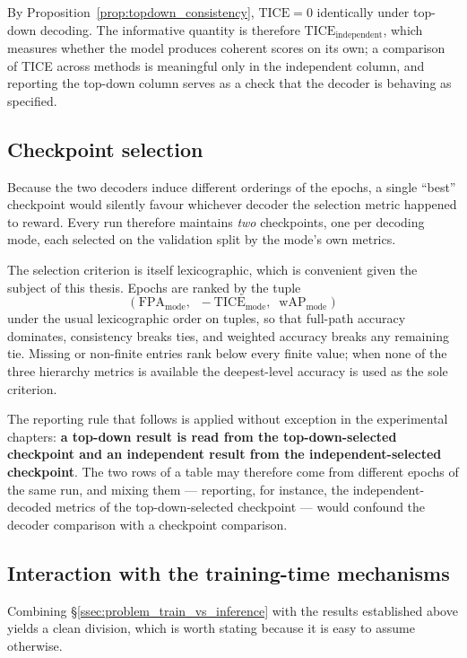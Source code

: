 By Proposition~\ref{prop:topdown_consistency}, $\mathrm{TICE}=0$ identically under
top-down decoding. The informative quantity is therefore
$\mathrm{TICE}_{\text{independent}}$, which measures whether the model produces
coherent scores on its own; a comparison of TICE across methods is meaningful only
in the independent column, and reporting the top-down column serves as a check
that the decoder is behaving as specified.

\subsection{Checkpoint selection}
\label{ssec:inference_selection}

Because the two decoders induce different orderings of the epochs, a single
``best'' checkpoint would silently favour whichever decoder the selection metric
happened to reward. Every run therefore maintains \emph{two} checkpoints, one per
decoding mode, each selected on the validation split by the mode's own metrics.

The selection criterion is itself lexicographic, which is convenient given the
subject of this thesis. Epochs are ranked by the tuple
\[
\Big(\;\mathrm{FPA}_{\text{mode}},\;\; -\mathrm{TICE}_{\text{mode}},\;\;
\mathrm{wAP}_{\text{mode}}\;\Big)
\]
under the usual lexicographic order on tuples, so that full-path accuracy
dominates, consistency breaks ties, and weighted accuracy breaks any remaining
tie. Missing or non-finite entries rank below every finite value; when none of the
three hierarchy metrics is available the deepest-level accuracy is used as the
sole criterion.

The reporting rule that follows is applied without exception in the experimental
chapters: \textbf{a top-down result is read from the top-down-selected checkpoint
and an independent result from the independent-selected checkpoint}. The two rows
of a table may therefore come from different epochs of the same run, and mixing
them --- reporting, for instance, the independent-decoded metrics of the
top-down-selected checkpoint --- would confound the decoder comparison with a
checkpoint comparison.

\subsection{Interaction with the training-time mechanisms}
\label{ssec:inference_interaction}

Combining \S\ref{ssec:problem_train_vs_inference} with the results established
above yields a clean division, which is worth stating because it is easy to
assume otherwise.

